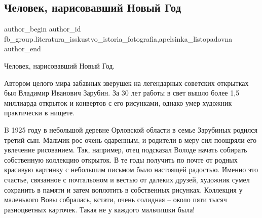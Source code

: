 
 
 
 
 
 
\subsection{Человек, нарисовавший Новый Год}
\label{sec:21_11_2021.fb.fb_group.literatura_isskustvo_istoria_fotografia.1.chelovek_risunok_new_year}
 
\ifcmt
 author_begin
   author_id fb_group.literatura_isskustvo_istoria_fotografia,apelsinka_listopadovna
 author_end
\fi

Человек, нарисовавший Новый Год. 

Автором целого мира забавных зверушек на легендарных советских открытках был
Владимир Иванович Зарубин. За 30 лет работы в свет вышло более 1,5 миллиарда
открыток и конвертов с его рисунками, однако умер художник практически в
нищете. 

\begin{multicols}{2}
\end{multicols}

B 1925 году в небольшой деревне Орловской области в семье Зарубиных родился
третий сын. Мальчик рос очень одаренным, и родители в меру сил поощряли его
увлечение рисованием. Так, например, отец подсказал Володе начать собирать
собственную коллекцию открыток. В те годы получить по почте от родных красивую
картинку с небольшим письмом было настоящей радостью. Именно это счастье,
связанное с почтальоном и вестью от далеких друзей, художник сумел сохранить в
памяти и затем воплотить в собственных рисунках. Коллекция у маленького Вовы
собралась, кстати, очень солидная – около пяти тысяч разноцветных карточек.
Такая не у каждого мальчишки была! 


